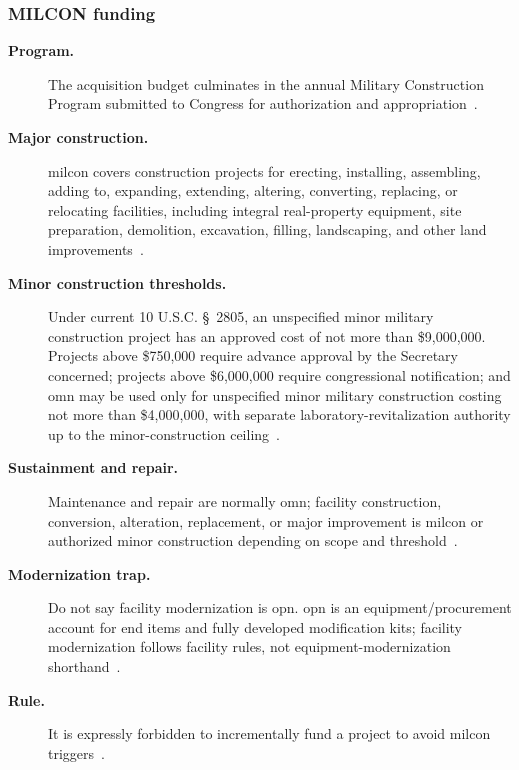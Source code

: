 \documentclass[../main.tex]{subfiles}
\begin{document}
\subsubsection{MILCON funding}
\begin{description}
  \item[\textbf{Program.}] The acquisition budget culminates in the annual Military Construction Program submitted to Congress for authorization and appropriation~\autocite{edo-3-1-3-program-funding-2025,DoDFMR-Vol2B-Ch6}.
  \item[\textbf{Major construction.}] \ac{milcon} covers construction projects for erecting, installing, assembling, adding to, expanding, extending, altering, converting, replacing, or relocating facilities, including integral real-property equipment, site preparation, demolition, excavation, filling, landscaping, and other land improvements~\autocite{DoDFMR-Vol2B-Ch6}.
  \item[\textbf{Minor construction thresholds.}] Under current 10 U.S.C. \S~2805, an unspecified minor military construction project has an approved cost of not more than \$9,000,000. Projects above \$750,000 require advance approval by the Secretary concerned; projects above \$6,000,000 require congressional notification; and \ac{omn} may be used only for unspecified minor military construction costing not more than \$4,000,000, with separate laboratory-revitalization authority up to the minor-construction ceiling~\autocite{USC-2805-MinorMILCON,DoDFMR-Vol2B-Ch6}.
  \item[\textbf{Sustainment and repair.}] Maintenance and repair are normally \ac{omn}; facility construction, conversion, alteration, replacement, or major improvement is \ac{milcon} or authorized minor construction depending on scope and threshold~\autocite{edo-3-1-3-program-funding-2025,DoDFMR-Vol2A-Ch1,DoDFMR-Vol2B-Ch6}.
  \item[\textbf{Modernization trap.}] Do not say facility modernization is \ac{opn}. \ac{opn} is an equipment/procurement account for end items and fully developed modification kits; facility modernization follows facility rules, not equipment-modernization shorthand~\autocite{DoDFMR-Vol2A-Ch1,DoDFMR-Vol2B-Ch6}.
  \item[\textbf{Rule.}] It is expressly forbidden to incrementally fund a project to avoid \ac{milcon} triggers~\autocite{edo-3-1-3-program-funding-2025,DoDFMR-Vol2B-Ch6}.
\end{description}
\end{document}
